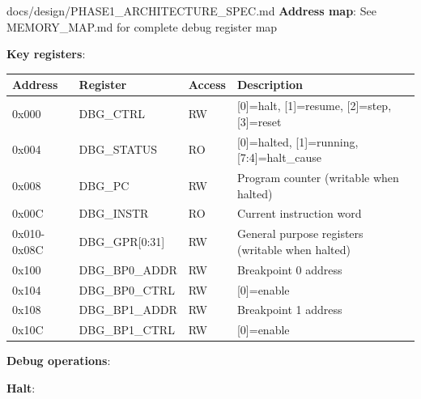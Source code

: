 \begin{relocated}{docs/design/PHASE1_ARCHITECTURE_SPEC.md}
\textbf{Address map}: See MEMORY\_\allowbreak{}MAP.md for complete debug
register map

\textbf{Key registers}:

{
\begin{longtable}[]{@{}
  >{\centering\arraybackslash}p{}
  >{\centering\arraybackslash}p{}
  >{\centering\arraybackslash}p{}
  >{\centering\arraybackslash}p{}@{}}
\toprule\noalign{}
\begin{minipage}[b]{\linewidth}\centering
Address
\end{minipage} & \begin{minipage}[b]{\linewidth}\centering
Register
\end{minipage} & \begin{minipage}[b]{\linewidth}\centering
Access
\end{minipage} & \begin{minipage}[b]{\linewidth}\centering
Description
\end{minipage} \\
\midrule\noalign{}
\endhead
\bottomrule\noalign{}
\endlastfoot
0x000 & DBG\_CTRL & RW & {[}0{]}=halt, {[}1{]}=resume, {[}2{]}=step,
{[}3{]}=reset \\
0x004 & DBG\_\allowbreak{}STATUS & RO & {[}0{]}=halted, {[}1{]}=running,
{[}7:4{]}=halt\_\allowbreak{}cause \\
0x008 & DBG\_PC & RW & Program counter (writable when halted) \\
0x00C & DBG\_INSTR & RO & Current instruction word \\
0x010-0x08C & DBG\_\allowbreak{}GPR{[}0:31{]} & RW & General purpose
registers (writable when halted) \\
0x100 & DBG\_\allowbreak{}BP0\_\allowbreak{}ADDR & RW & Breakpoint 0
address \\
0x104 & DBG\_\allowbreak{}BP0\_\allowbreak{}CTRL & RW &
{[}0{]}=enable \\
0x108 & DBG\_\allowbreak{}BP1\_\allowbreak{}ADDR & RW & Breakpoint 1
address \\
0x10C & DBG\_\allowbreak{}BP1\_\allowbreak{}CTRL & RW &
{[}0{]}=enable \\
\end{longtable}
}

\textbf{Debug operations}:

\textbf{Halt}:


\end{relocated}
